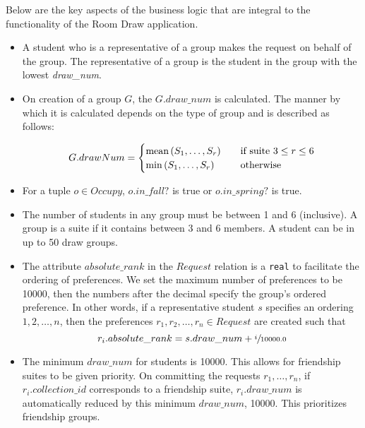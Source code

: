 \noindent Below are the key aspects of the business logic that are integral to
the functionality of the Room Draw application.

\begin{itemize}
\item A student who is a representative of a group makes the request on behalf
of the group. The representative of a group is the student in the group with the
lowest \emph{draw\_num}.

\item On creation of a group \(G\), the \(G.draw\_num\) is calculated. The
manner by which it is calculated depends on the type of group and is described
as follows:

\[
    G.drawNum =
        \begin{cases}
        \text{mean} \del{S_1, \ldots, S_r} & \quad \mbox{if suite \(3 \leq r \leq 6\)} \\
        \min \del{S_1, \ldots, S_r} & \quad \mbox{otherwise}
        \end{cases}
\]

\item For a tuple \(o \in Occupy\), \(o.in\_fall?\) is true or \(o.in\_spring?\) is true.

\item The number of students in any group must be between 1 and 6 (inclusive). A
group is a suite if it contains between 3 and 6 members. A student can be in up
to 50 draw groups.

\item The attribute \(absolute\_rank\) in the \(Request\) relation is a
\texttt{real} to facilitate the ordering of preferences.  We set the maximum
number of preferences to be \num{10000}, then the numbers after the decimal
specify the group's ordered preference. In other words, if a representative
student \(s\) specifies an ordering \(1,2,\ldots, n\), then the preferences
\(r_1,r_2, \ldots, r_n \in Request\) are created such that \[r_i.absolute\_rank
= s.draw\_num + \sfrac{i}{10000.0}\]

\item The minimum \(draw\_num\) for students is \num{10000}. This allows for
friendship suites to be given priority. On committing the requests \(r_1,
\ldots, r_n\), if \(r_i.collection\_id\) corresponds to a friendship suite,
\(r_i.draw\_num\) is automatically reduced by this minimum \(draw\_num\),
\num{10000}. This prioritizes friendship groups.
\end{itemize}

